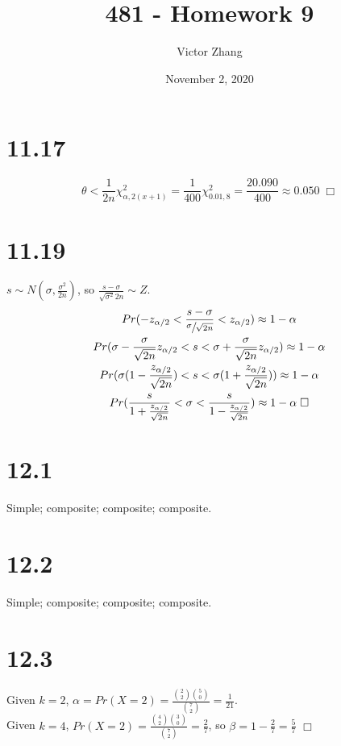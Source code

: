 \documentclass{article}
\title{481 - Homework 9}
\author{Victor Zhang}
\date{November 2, 2020}
\begin{document}
\maketitle

\section*{11.17}
$$\theta < \frac{1}{2n}\chi^2_{\alpha,2(x+1)} = \frac{1}{400} \chi^2_{0.01,8} = \frac{20.090}{400} \approx 0.050 \;\Box$$

\section*{11.19}
$s \sim N(\sigma,\frac{\sigma^2}{2n})$, so $\frac{s-\sigma}{\sqrt{\sigma^2}{2n}} \sim Z$.
\begin{gather*}
Pr(-z_{\alpha/2} < \frac{s-\sigma}{\sfrac{\sigma}{\sqrt{2n}}} < z_{\alpha/2}) \approx 1-\alpha\\
Pr(\sigma - \frac{\sigma}{\sqrt{2n}}z_{\alpha/2} < s < \sigma + \frac{\sigma}{\sqrt{2n}}z_{\alpha/2}) \approx 1-\alpha\\
Pr(\sigma(1-\frac{z_{\alpha/2}}{\sqrt{2n}}) < s < \sigma(1+\frac{z_{\alpha/2}}{\sqrt{2n}})) \approx 1-\alpha\\
Pr(\frac{s}{1+\frac{z_{\alpha/2}}{\sqrt{2n}}} < \sigma < \frac{s}{1-\frac{z_{\alpha/2}}{\sqrt{2n}}}) \approx 1-\alpha \;\Box
\end{gather*}

\section*{12.1}
Simple; composite; composite; composite.
\section*{12.2}
Simple; composite; composite; composite.

\section*{12.3}
Given $k = 2$, $\alpha = Pr(X = 2) = \frac{\binom{2}{2}\binom{5}{0}}{\binom{7}{2}} = \frac{1}{21}$.\\
Given $k = 4$, $Pr(X = 2) = \frac{\binom{4}{2}\binom{3}{0}}{\binom{7}{2}} = \frac{2}{7}$, so $\beta = 1-\frac{2}{7} = \frac{5}{7}$ $\Box$
\end{document}
